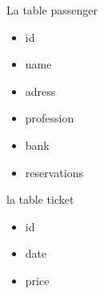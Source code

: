 \documentclass{article}
\begin{document}
        La table passenger 
            \begin{itemize}
                \centering
                \item id 
                \item name
                \item adress
                \item profession
                \item bank 
                \item reservations
            \end{itemize}
        la table ticket 
            \begin{itemize}
                \centering
                \item id 
                \item date
                \item price
            \end{itemize}
            
\end{document}

